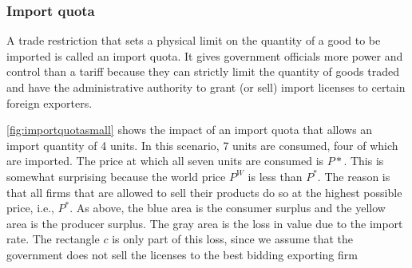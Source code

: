 

\subsubsection{Import quota}
\begin{minipage}{0.55\linewidth}	
	A trade restriction that sets a physical limit on the quantity of a good to be imported is called an import quota. It gives government officials more power and control than a tariff because they can strictly limit the quantity of goods traded and have the administrative authority to grant (or sell) import licenses to certain foreign exporters. 
	
	\autoref{fig:importquotasmall} shows the impact of an import quota that allows an import quantity of 4 units. In this scenario, 7 units are consumed, four of which are imported. The price at which all seven units are consumed is $P*$. This is somewhat surprising because the world price $P^W$ is less than $P^*$. The reason is that all firms that are allowed to sell their products do so at the highest possible price, i.e., $P^*$.  As above, the blue area is the consumer surplus and the yellow area is the producer surplus. The gray area is the loss in value due to the import rate. The rectangle $c$ is only part of this loss, since we assume that the government does not sell the licenses to the best bidding exporting firm
\end{minipage}

